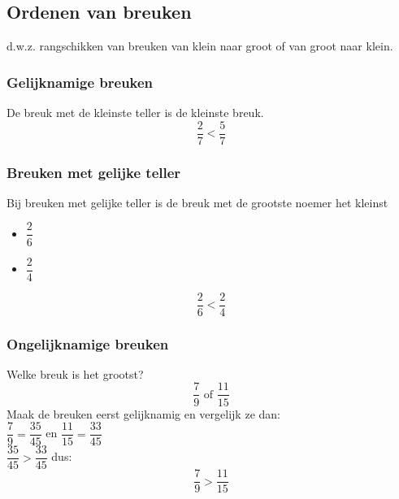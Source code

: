 \documentclass{bis}
\begin{document}
\subsection{Ordenen van breuken}

d.w.z. rangschikken van breuken van klein naar groot of van groot naar klein.

\subsubsection{Gelijknamige breuken}

De breuk met de kleinste teller is de kleinste breuk.
\[\dfrac{2}{7} < \dfrac{5}{7}\]

\subsubsection{Breuken met gelijke teller}

Bij breuken met gelijke teller is de breuk met de grootste noemer het kleinst

\begin{itemize}
  \item $\dfrac{2}{6}$\hspace*{1em}
  \item $\dfrac{2}{4}$\hspace*{1em}
\end{itemize}

\[\dfrac{2}{6} < \dfrac{2}{4}\]

\subsubsection{Ongelijknamige breuken}

\begin{voorbeeld}
Welke breuk is het grootst?
\[\dfrac{7}{9} \text{ of } \dfrac{11}{15}\]
Maak de breuken eerst gelijknamig en vergelijk ze dan:\\
$\dfrac{7}{9}=\dfrac{35}{45}$ en $\dfrac{11}{15}=\dfrac{33}{45}$\\
$\dfrac{35}{45}>\dfrac{33}{45}$ dus:
\[\dfrac{7}{9}>\dfrac{11}{15}\]
\end{voorbeeld}
\end{document}
